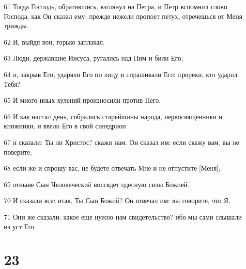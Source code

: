 \par 61 Тогда Господь, обратившись, взглянул на Петра, и Петр вспомнил слово Господа, как Он сказал ему: прежде нежели пропоет петух, отречешься от Меня трижды.
\par 62 И, выйдя вон, горько заплакал.
\par 63 Люди, державшие Иисуса, ругались над Ним и били Его;
\par 64 и, закрыв Его, ударяли Его по лицу и спрашивали Его: прореки, кто ударил Тебя?
\par 65 И много иных хулений произносили против Него.
\par 66 И как настал день, собрались старейшины народа, первосвященники и книжники, и ввели Его в свой синедрион
\par 67 и сказали: Ты ли Христос? скажи нам. Он сказал им: если скажу вам, вы не поверите;
\par 68 если же и спрошу вас, не будете отвечать Мне и не отпустите [Меня];
\par 69 отныне Сын Человеческий воссядет одесную силы Божией.
\par 70 И сказали все: итак, Ты Сын Божий? Он отвечал им: вы говорите, что Я.
\par 71 Они же сказали: какое еще нужно нам свидетельство? ибо мы сами слышали из уст Его.

\chapter{23}

